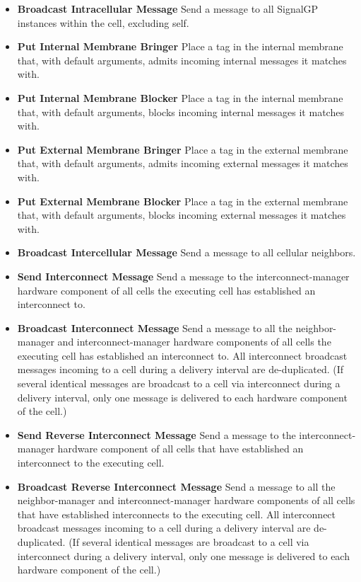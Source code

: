 \begin{itemize}
\item \textbf{Broadcast Intracellular Message}
Send a message to all SignalGP instances within the cell, excluding self.
\item \textbf{Put Internal Membrane Bringer}
Place a tag in the internal membrane that, with default arguments, admits incoming internal messages it matches with.
\item \textbf{Put Internal Membrane Blocker}
Place a tag in the internal membrane that, with default arguments, blocks incoming internal messages it matches with.
\item \textbf{Put External Membrane Bringer}
Place a tag in the external membrane that, with default arguments, admits incoming external messages it matches with.
\item \textbf{Put External Membrane Blocker}
Place a tag in the external membrane that, with default arguments, blocks incoming external messages it matches with.
\item \textbf{Broadcast Intercellular Message}
Send a message to all cellular neighbors.
\item \textbf{Send Interconnect Message}
Send a message to the interconnect-manager hardware component of all cells the executing cell has established an interconnect to.
\item \textbf{Broadcast Interconnect Message}
Send a message to all the neighbor-manager and interconnect-manager hardware components of all cells the executing cell has established an interconnect to.
All interconnect broadcast messages incoming to a cell during a delivery interval are de-duplicated.
(If several identical messages are broadcast to a cell via interconnect during a delivery interval, only one message is delivered to each hardware component of the cell.)
\item \textbf{Send Reverse Interconnect Message}
Send a message to the interconnect-manager hardware component of all cells that have established an interconnect to the executing cell.
\item \textbf{Broadcast Reverse Interconnect Message}
Send a message to all the neighbor-manager and interconnect-manager hardware components of all cells that have established interconnects to the executing cell.
All interconnect broadcast messages incoming to a cell during a delivery interval are de-duplicated.
(If several identical messages are broadcast to a cell via interconnect during a delivery interval, only one message is delivered to each hardware component of the cell.)

\end{itemize}
